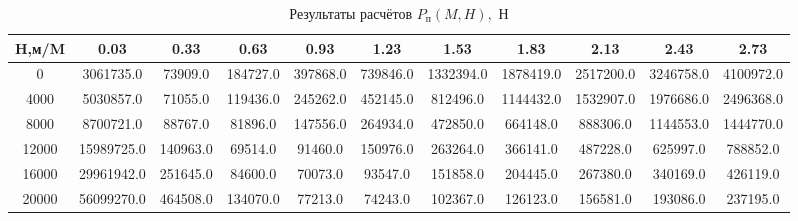 \begin{table}[H]
\centering
\caption{Результаты расчётов $P_\text{п}(M,H),$ Н}
\label{Pp}
\begin{tabular}{|c|c|c|c|c|c|c|c|c|c|c|}
\toprule
H,м/M &        0.03 &      0.33 &      0.63 &      0.93 &      1.23 &       1.53 &       1.83 &       2.13 &       2.43 &       2.73 \\
\midrule
0     &   3061735.0 &   73909.0 &  184727.0 &  397868.0 &  739846.0 &  1332394.0 &  1878419.0 &  2517200.0 &  3246758.0 &  4100972.0 \\
4000  &   5030857.0 &   71055.0 &  119436.0 &  245262.0 &  452145.0 &   812496.0 &  1144432.0 &  1532907.0 &  1976686.0 &  2496368.0 \\
8000  &   8700721.0 &   88767.0 &   81896.0 &  147556.0 &  264934.0 &   472850.0 &   664148.0 &   888306.0 &  1144553.0 &  1444770.0 \\
12000 &  15989725.0 &  140963.0 &   69514.0 &   91460.0 &  150976.0 &   263264.0 &   366141.0 &   487228.0 &   625997.0 &   788852.0 \\
16000 &  29961942.0 &  251645.0 &   84600.0 &   70073.0 &   93547.0 &   151858.0 &   204445.0 &   267380.0 &   340169.0 &   426119.0 \\
20000 &  56099270.0 &  464508.0 &  134070.0 &   77213.0 &   74243.0 &   102367.0 &   126123.0 &   156581.0 &   193086.0 &   237195.0 \\
\bottomrule
\end{tabular}
\end{table}
